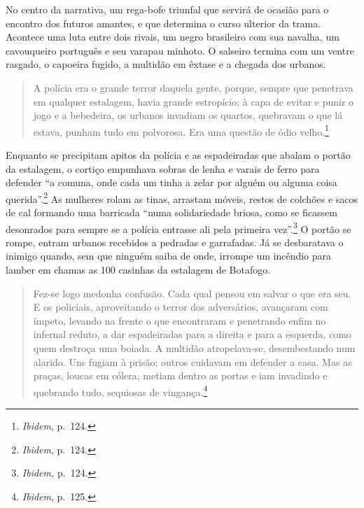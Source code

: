 No centro da narrativa, um rega-bofe triunfal que servirá de ocasião
para o encontro dos futuros amantes, e que determina o curso ulterior da
trama. Acontece uma luta entre dois rivais, um negro brasileiro com sua
navalha, um cavouqueiro português e seu varapau minhoto. O salseiro
termina com um ventre rasgado, o capoeira fugido, a multidão em êxtase e
a chegada dos urbanos.

\begin{quote}
A polícia era o grande terror daquela gente, porque, sempre que
penetrava em qualquer estalagem, havia grande estropício; à capa de
evitar e punir o jogo e a bebedeira, os urbanos invadiam os quartos,
quebravam o que lá estava, punham tudo em polvorosa. Era uma questão de
ódio velho.\footnote{\emph{Ibidem}, p.~124.}
\end{quote}

Enquanto se precipitam apitos da polícia e as espadeiradas que abalam o
portão da estalagem, o cortiço empunhava sobras de lenha e varais de
ferro para defender ``a comuna, onde cada um tinha a zelar por alguém ou
alguma coisa querida''.\footnote{\emph{Ibidem}, p.~124.} As mulheres
rolam as tinas, arrastam móveis, restos de colchões e sacos de cal
formando uma barricada ``numa solidariedade briosa, como se ficassem
desonrados para sempre se a polícia entrasse ali pela primeira
vez''.\footnote{\emph{Ibidem,} p.~124.} O portão se rompe, entram
urbanos recebidos a pedradas e garrafadas. Já se desbaratava o inimigo
quando, sem que ninguém saiba de onde, irrompe um incêndio para lamber
em chamas as 100 casinhas da estalagem de Botafogo.

\begin{quote}
Fez-se logo medonha confusão. Cada qual pensou em salvar o que era seu.
E os policiais, aproveitando o terror dos adversários, avançaram com
ímpeto, levando na frente o que encontraram e penetrando enfim no
infernal reduto, a dar espadeiradas para a direita e para a esquerda,
como quem destroça uma boiada. A multidão atropelava-se, desembestando
num alarido. Uns fugiam à prisão; outros cuidavam em defender a casa.
Mas as praças, loucas em cólera, metiam dentro as portas e iam invadindo
e quebrando tudo, sequiosas de vingança.\footnote{\emph{Ibidem}, p.~125.}
\end{quote}

